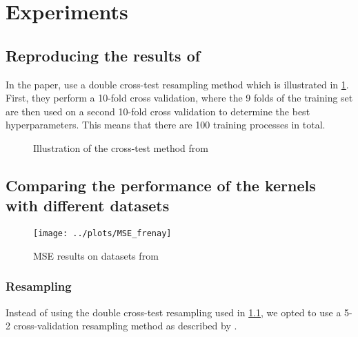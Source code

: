 \section{Experiments}

\subsection{Reproducing the results of \textcite{frenayParameterinsensitiveKernelExtreme2011}}
\label{sec:reproducing-frenay}


In the paper, \textcite{frenayParameterinsensitiveKernelExtreme2011} use a double cross-test resampling
method which is illustrated in \cref{fig:frenay-cross-test}. First, they perform a 10-fold cross validation,
where the 9 folds of the training set are then used on a second 10-fold cross validation to determine the
best hyperparameters. This means that there are 100 training processes in total.

\begin{figure}[H]
    
	\caption{Illustration of the cross-test method from \cite{frenayParameterinsensitiveKernelExtreme2011}}
	\label{fig:frenay-cross-test}
\end{figure}

\subsection{Comparing the performance of the kernels with different datasets}

\begin{figure}
    \texttt{[image: ../plots/MSE\_frenay]}
    \caption{MSE results on datasets from \cite{frenayParameterinsensitiveKernelExtreme2011}}
\end{figure}

\subsubsection{Resampling}

Instead of using the double cross-test resampling used in \cref{sec:reproducing-frenay},
we opted to use a 5-2 cross-validation resampling method as described by \textcite{dietterichApproximateStatisticalTests1998}.

